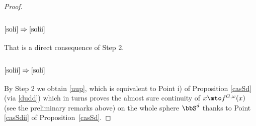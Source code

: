 \begin{proof}
\subsubsection*{$\eqref{soli}\Rightarrow\eqref{solii}$} That is a direct consequence of Step 2.

\subsubsection*{$\eqref{solii}\Rightarrow\eqref{soli}$} By Step 2 we obtain \eqref{uup}, which is equivalent to Point i) of Proposition \ref{casSd} (via \eqref{dudd}) which in turns proves the almost sure continuity of $x\mto f^{G,\omega}(x)$ (see the preliminary remarks above) on the whole sphere $\bbS^d$ thanks to Point \eqref{casSdii} of Proposition~\ref{casSd}.


\end{proof}
